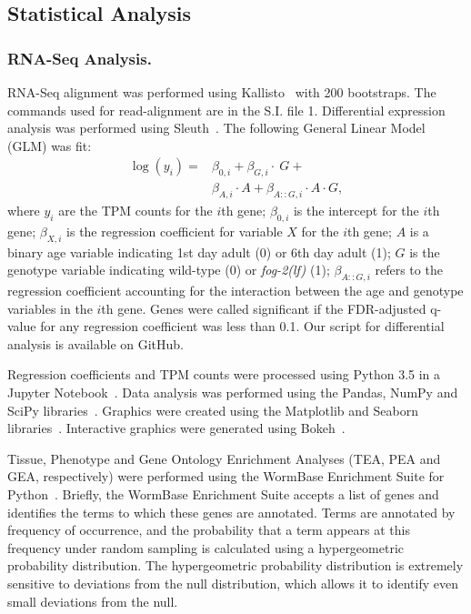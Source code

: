 \documentclass[9pt,twocolumn,twoside]{gsag3jnl}
\newcommand{\fog}{\emph{\mbox{fog-2(lf)}}}
\begin{document}
\subsection*{Statistical Analysis}
\label{sb:statistics}

\subsubsection*{RNA-Seq Analysis.}
RNA-Seq alignment was performed using Kallisto~\citep{Bray2016} with 200
bootstraps. The commands used for read-alignment are in the S.I. file 1.
Differential expression analysis was performed using Sleuth~\citep{Pimentel2016}.
The following General Linear Model (GLM) was fit:
\begin{align*}
  \log(y_i) =& \beta_{0,i} + \beta_{G,i}\cdot~G + \\
  &\beta_{A,i}\cdot A + \beta_{A::G,i}\cdot A\cdot G,
  \label{eqn:GLM}
\end{align*}
where $y_i$ are the TPM counts for the $i$th gene; $\beta_{0,i}$ is the intercept
for the $i$th gene; $\beta_{X,i}$ is the regression coefficient for variable
$X$ for the $i$th gene; $A$ is a binary age variable indicating 1st day adult
(0) or 6th day adult (1); $G$ is the genotype variable indicating wild-type
(0) or \fog{} (1); $\beta_{A::G, i}$ refers to the regression coefficient
accounting for the interaction between the age and genotype variables in the
$i$th gene. Genes were called significant if the FDR-adjusted q-value for any
regression coefficient was less than 0.1. Our script for differential analysis
is available on GitHub.

Regression coefficients and TPM counts were processed using Python 3.5 in a
Jupyter Notebook~\citep{Perez2007}. Data analysis was performed using the Pandas,
NumPy and SciPy libraries~\citep{McKinney2011,VanDerWalt2011,Oliphant2007}.
Graphics were created using the Matplotlib and Seaborn
libraries~\citep{Waskom,Hunter2007}. Interactive graphics were generated using
Bokeh~\citep{Team2014}.

Tissue, Phenotype and Gene Ontology Enrichment Analyses (TEA, PEA and GEA,
respectively) were performed using the WormBase Enrichment Suite for
Python~\citep{Angeles-Albores2016,Angeles-Albores106369}. Briefly, the WormBase
Enrichment Suite accepts a list of genes and identifies the terms to which these
genes are annotated. Terms are annotated by frequency of occurrence, and the
probability that a term appears at this frequency under random sampling is
calculated using a hypergeometric probability distribution. The hypergeometric
probability distribution is extremely sensitive to deviations from the null
distribution, which allows it to identify even small deviations from the null.
\end{document}
